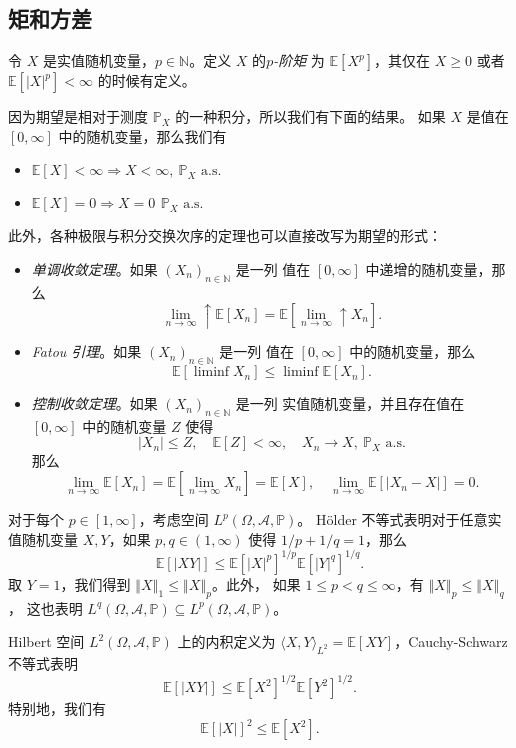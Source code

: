 \documentclass[fontset=none]{Notes}
\newcommand{\ulim}[1][]{\lim_{#1}\mathrel{\uparrow}}
\newcommand{\alsu}[1]{\text{$#1$ a.s.}}
\newcommand{\norm}[1]{\left\Vert#1\right\Vert}
\begin{document}
\subsection{矩和方差}

令 $X$ 是实值随机变量，$p\in \mathbb{N}$。定义 $X$ 的\emph{$p$-阶矩}
为 $\mathbb{E}[X^p]$，其仅在 $X\geq 0$ 或者 $\mathbb{E}[|X|^p]<\infty$
的时候有定义。

因为期望是相对于测度 $\mathbb{P}_X$ 的一种积分，所以我们有下面的结果。
如果 $X$ 是值在 $[0,\infty]$ 中的随机变量，那么我们有
\begin{itemize}[nosep]
  \item $\mathbb{E}[X]<\infty\Rightarrow X<\infty,\ \alsu{\mathbb{P}_X}$
  \item $\mathbb{E}[X]=0\Rightarrow X=0\,\ \alsu{\mathbb{P}_X}$
\end{itemize}
此外，各种极限与积分交换次序的定理也可以直接改写为期望的形式：
\begin{itemize}[nosep]
  \item \emph{单调收敛定理}。如果 $(X_n)_{n\in \mathbb{N}}$ 是一列
  值在 $[0,\infty]$ 中递增的随机变量，那么
  \[
    \ulim[n\to\infty]  \mathbb{E}[X_n]=\mathbb{E}\left[\ulim[n\to\infty]X_n\right].
  \]
  \item \emph{Fatou 引理}。如果 $(X_n)_{n\in \mathbb{N}}$ 是一列
  值在 $[0,\infty]$ 中的随机变量，那么
  \[
    \mathbb{E}[\liminf X_n]\leq \liminf \mathbb{E}[X_n].  
  \]
  \item \emph{控制收敛定理}。如果 $(X_n)_{n\in \mathbb{N}}$ 是一列
  实值随机变量，并且存在值在 $[0,\infty]$ 中的随机变量 $Z$ 使得
  \[
    |X_n|\leq Z,\quad \mathbb{E}[Z]<\infty, \quad X_n\to X,\ 
    \alsu{\mathbb{P}_X}  
  \]
  那么
  \[
    \lim_{n\to\infty}\mathbb{E}[X_n]=\mathbb{E}\left[\lim_{n\to\infty}X_n\right]=\mathbb{E}[X],
    \quad \lim_{n\to\infty}\mathbb{E}[|X_n-X|]=0.
  \]
\end{itemize}

对于每个 $p\in[1,\infty]$，考虑空间 $L^p(\Omega,\mathcal{A},\mathbb{P})$。
H\"older 不等式表明对于任意实值随机变量 $X,Y$，如果 $p,q\in (1,\infty)$
使得 $1/p+1/q=1$，那么
\[
  \mathbb{E}[|XY|]\leq \mathbb{E}[|X|^p]^{1/p}\mathbb{E}[|Y|^q]^{1/q}. 
\]
取 $Y=1$，我们得到 $\norm{X}_1\leq\norm{X}_p$。此外，
如果 $1\leq p<q\leq \infty$，有 $\norm{X}_p\leq \norm{X}_q$，
这也表明 $L^q(\Omega, \mathcal{A},\mathbb{P})\subseteq L^p(\Omega,\mathcal{A},\mathbb{P})$。

Hilbert 空间 $L^2(\Omega,\mathcal{A},\mathbb{P})$ 上的内积定义为
$\langle X,Y\rangle_{L^2}=\mathbb{E}[XY]$，Cauchy-Schwarz 不等式表明
\[
  \mathbb{E}[|XY|]\leq \mathbb{E}[X^2]  ^{1/2}\mathbb{E}[Y^2]^{1/2}.
\]
特别地，我们有
\[
  \mathbb{E}[|X|]^2\leq \mathbb{E}[X^2].  
\]
\end{document}

